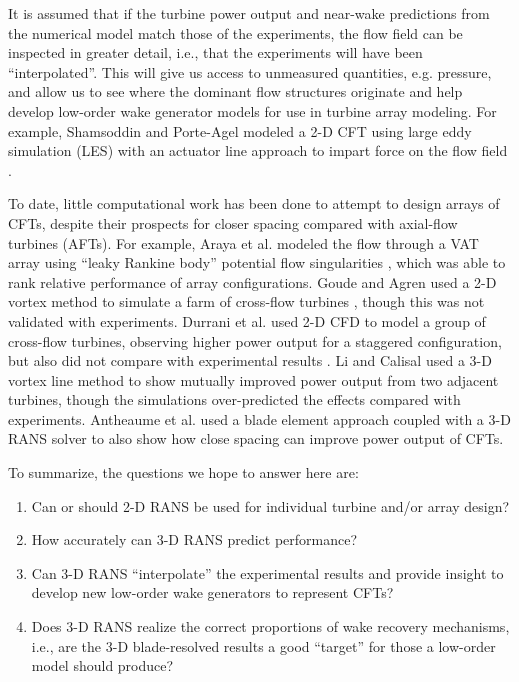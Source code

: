 It is assumed that if the turbine power output and near-wake predictions from
the numerical model match those of the experiments, the flow field can be
inspected in greater detail, i.e., that the experiments will have been
``interpolated''. This will give us access to unmeasured quantities, e.g.
pressure, and allow us to see where the dominant flow structures originate and
help develop low-order wake generator models for use in turbine array modeling.
For example, Shamsoddin and Porte-Agel modeled a 2-D CFT using large eddy
simulation (LES) with an actuator line approach to impart force on the flow
field \cite{Shamsoddin2014}.

To date, little computational work has been done to attempt to design arrays of
CFTs, despite their prospects for closer spacing compared with axial-flow
turbines (AFTs). For example, Araya et al. modeled the flow through a VAT array
using ``leaky Rankine body'' potential flow singularities \cite{Araya2014},
which was able to rank relative performance of array configurations. Goude and
Agren used a 2-D vortex method to simulate a farm of cross-flow turbines
\cite{Goude2010}, though this was not validated with experiments. Durrani et al.
used 2-D CFD to model a group of cross-flow turbines, observing higher power
output for a staggered configuration, but also did not compare with experimental
results \cite{Durrani2011}. 
Li and Calisal \cite{Li2010} used a 3-D vortex line
method to show mutually improved power output from two adjacent turbines, though
the simulations over-predicted the effects compared with experiments. Antheaume
et al. \cite{Antheaume2008} used a blade element approach coupled with a 3-D
RANS solver to also show how close spacing can improve power output of CFTs.

To summarize, the questions we hope to answer here are:

\begin{enumerate}

    \item Can or should 2-D RANS be used for individual turbine and/or array
    design?

    \item How accurately can 3-D RANS predict performance?

    \item Can 3-D RANS ``interpolate'' the experimental results and provide
    insight to develop new low-order wake generators to represent CFTs?

    \item Does 3-D RANS realize the correct proportions of wake recovery
    mechanisms, i.e., are the 3-D blade-resolved results a good ``target'' for
    those a low-order model should produce?

\end{enumerate}


